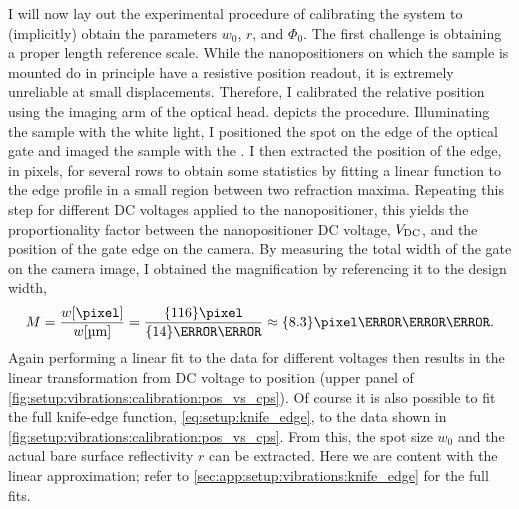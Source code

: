 I will now lay out the experimental procedure of calibrating the system to (implicitly) obtain the parameters $w_0$, $r$, and $\Phi_0$.
The first challenge is obtaining a proper length reference scale.
While the nanopositioners on which the sample is mounted do in principle have a resistive position readout, it is extremely unreliable at small displacements.
Therefore, I calibrated the relative position using the imaging arm of the optical head.
 depicts the procedure.
Illuminating the sample with the white light, I positioned the spot on the edge of the optical gate and imaged the sample with the \cmoscam.
I then extracted the position of the edge, in pixels, for several rows to obtain some statistics by fitting a linear function to the edge profile in a small region between two refraction maxima.
Repeating this step for different DC voltages applied to the nanopositioner,
this yields the proportionality factor between the nanopositioner DC voltage, $V_{\mathrm{DC}}$, and the position of the gate edge on the camera.
By measuring the total width of the gate on the camera image, I obtained the magnification by referencing it to the design width,
\begin{equation}\label{eq:setup:knife_edge:magnification}
    M = \frac{w[\unit{\pixel}]}{w[\unit{\micro\meter}]} = \frac{\qty{116}{\pixel}}{\qty{14}{\micro\meter}} \approx \qty{8.3}{\pixel\per\micro\meter}.
\end{equation}
Again performing a linear fit to the data for different voltages then results in the linear transformation from DC voltage to position (upper panel of \cref{fig:setup:vibrations:calibration:pos_vs_cps}).
Of course it is also possible to fit the full knife-edge function, \cref{eq:setup:knife_edge}, to the data shown in \cref{fig:setup:vibrations:calibration:pos_vs_cps}.
From this, the spot size $w_0$ and the actual bare  surface reflectivity $r$ can be extracted.
Here we are content with the linear approximation; refer to \cref{sec:app:setup:vibrations:knife_edge} for the full fits.

